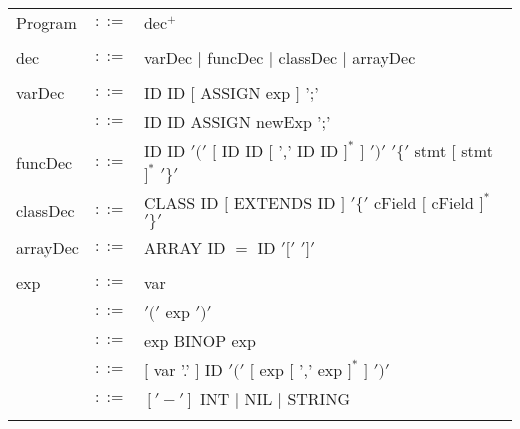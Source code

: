 \documentclass{article}
\begin{document}
\newpage
\begin{table}[h]
\centering
\begin{tabular}{ l c l }
Program  & $::=$ & dec$^{+}$ \\
\\
dec      & $::=$ & varDec $|$ funcDec $|$ classDec $|$ arrayDec \\
\\
varDec   & $::=$ & ID ID $[$ ASSIGN exp $]$ ';' \\
         & $::=$ & ID ID ASSIGN newExp ';'      \\
funcDec  & $::=$ & ID ID $'('$ $[$ ID ID $[$ ',' ID ID $]^{*}$ $]$ $')'$ %
                   $'\{'$ stmt   $[$ stmt $]^{*}$ $'\}'$                 \\
classDec & $::=$ & CLASS ID $[$ EXTENDS ID $]$ $'\{'$ cField $[$ cField $]^{*}$ $'\}'$ \\
arrayDec & $::=$ & ARRAY ID $=$ ID $'['$ $']'$ \\
\\
exp      & $::=$ & var                                                            \\
         & $::=$ & $'('$ exp $')'$                                                \\
         & $::=$ & exp BINOP exp                                                  \\
         & $::=$ & $[$ var '.' $]$ ID $'('$ $[$ exp $[$ ',' exp $]^{*}$ $]$ $')'$ \\
         & $::=$ & $['-']$ INT $|$ NIL $|$ STRING                                 \\
\\

\end{tabular}
\end{table}
\end{document}
